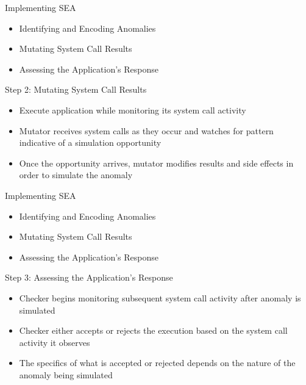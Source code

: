 \documentclass[pdf]{beamer}
\begin{document}
\begin{frame}{Implementing SEA}
  \begin{itemize}
    \item{Identifying and Encoding Anomalies}
    \item{\textrightarrow{}Mutating System Call Results\textleftarrow{}}
    \item{Assessing the Application's Response}
  \end{itemize}
\end{frame}


\begin{frame}{Step 2: Mutating System Call Results}
  \begin{itemize}
    \item{Execute application while monitoring its system call activity}
    \item{Mutator receives system calls as they occur and watches for pattern
      indicative of a simulation opportunity}
    \item{Once the opportunity arrives, mutator modifies results and side effects
      in order to simulate the anomaly}
  \end{itemize}
\end{frame}


\begin{frame}{Implementing SEA}
  \begin{itemize}
    \item{Identifying and Encoding Anomalies}
    \item{Mutating System Call Results}
    \item{\textrightarrow{}Assessing the Application's Response\textleftarrow{}}
  \end{itemize}
\end{frame}


\begin{frame}{Step 3: Assessing the Application's Response}
  \begin{itemize}
    \item{Checker begins monitoring subsequent system call activity
      after anomaly is simulated}
    \item{Checker either accepts or rejects the execution based on the system
      call activity it observes}
    \item{The specifics of what is accepted or rejected depends on the nature
      of the anomaly being simulated}
  \end{itemize}
\end{frame}
\end{document}
